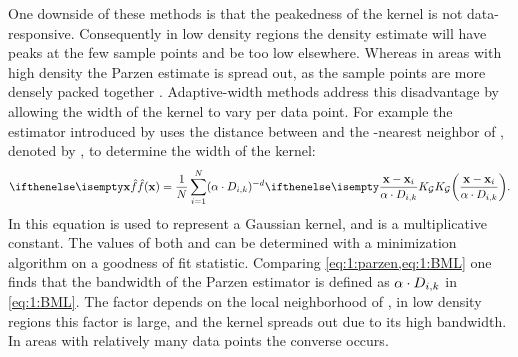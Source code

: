 	One downside of these methods is that the peakedness of the kernel is not data-responsive. Consequently in low density regions the density estimate will have peaks at the few sample points and be too low elsewhere. Whereas in areas with high density the Parzen estimate is spread out, as the sample points are more densely packed together \cite{breiman1977variable}. Adaptive-width methods address this disadvantage by allowing the width of the kernel to vary per data point. For example the estimator introduced by \citeauthor{breiman1977variable} uses the distance between \varPattern[\itXis] and the \KNNK-nearest neighbor of \varPattern[\itXis], denoted by \varKNNDistance{\itXis}{\KNNK}, to determine the width of the kernel:
	\begin{equation}\label{eq:1:BML}
	 	\varEstimatedDensityFunction{\varPattern} = \frac{1}{\varNumPatterns} \sum_{\itXis = 1}^{\varNumPatterns} (\varBMLconstant \cdot \varKNNDistance{\itXis}{k})^{-\varDim} \varKernel[\varGaussian]{\frac{\varPattern - \varPattern[\itXis]}{\varBMLconstant \cdot \varKNNDistance{\itXis}{k}}}.
	\end{equation} 
	In this equation \varKernel[\varGaussian]{} is used to represent a Gaussian kernel, and \varBMLconstant is a multiplicative constant. The values of both \varBMLconstant and \KNNK can be determined with a minimization algorithm on a goodness of fit statistic. Comparing \cref{eq:1:parzen,eq:1:BML} one finds that the bandwidth \varBandwidth of the Parzen estimator is defined as $\alpha \cdot D_{i, k}$ in \cref{eq:1:BML}. The factor \varKNNDistance{\itXis}{\KNNK} depends on the local neighborhood of \varPattern[\itXis], in low density regions this factor is large, and the kernel spreads out due to its high bandwidth. In areas with relatively many data points the converse occurs.

